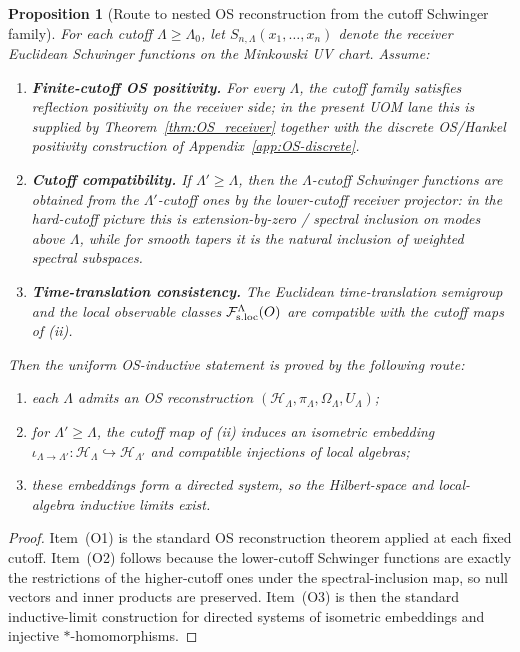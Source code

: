\documentclass[10pt]{article}
\theoremstyle{definition}
\theoremstyle{plain}
\newtheorem{proposition}{Proposition}[section]
\begin{document}
\begin{proposition}[Route to nested OS reconstruction from the cutoff Schwinger family]
\label{prop:uom-OS-inductive-route}
For each cutoff $\Lambda\ge\Lambda_0$, let
\(
S_{n,\Lambda}(x_1,\dots,x_n)
\)
denote the receiver Euclidean Schwinger functions on the Minkowski UV chart.  Assume:
\begin{enumerate}[label=\textnormal{(\roman*)},leftmargin=2.2em,itemsep=1pt]
\item \textbf{Finite-cutoff OS positivity.}
For every $\Lambda$, the cutoff family satisfies reflection positivity on the receiver side; in the present UOM lane this is supplied by
Theorem~\ref{thm:OS_receiver} together with the discrete OS/Hankel positivity construction of Appendix~\ref{app:OS-discrete}.
\item \textbf{Cutoff compatibility.}
If $\Lambda'\ge\Lambda$, then the $\Lambda$-cutoff Schwinger functions are obtained from the $\Lambda'$-cutoff ones by the lower-cutoff
receiver projector: in the hard-cutoff picture this is extension-by-zero / spectral inclusion on modes above $\Lambda$, while for smooth
tapers it is the natural inclusion of weighted spectral subspaces.
\item \textbf{Time-translation consistency.}
The Euclidean time-translation semigroup and the local observable classes $\mathcal F_{\rm s.loc}^\Lambda(O)$ are compatible with the
cutoff maps of \textnormal{(ii)}.
\end{enumerate}
Then the uniform OS-inductive statement is proved by the following route:
\begin{enumerate}[label=\textnormal{(O\arabic*)},leftmargin=2.4em,itemsep=1pt]
\item each $\Lambda$ admits an OS reconstruction
\((\mathcal H_\Lambda,\pi_\Lambda,\Omega_\Lambda,U_\Lambda)\);
\item for $\Lambda'\ge\Lambda$, the cutoff map of \textnormal{(ii)} induces an isometric embedding
\(
\iota_{\Lambda\to\Lambda'}:\mathcal H_\Lambda\hookrightarrow\mathcal H_{\Lambda'}
\)
and compatible injections of local algebras;
\item these embeddings form a directed system, so the Hilbert-space and local-algebra inductive limits exist.
\end{enumerate}
\end{proposition}

\begin{proof}
Item~\textnormal{(O1)} is the standard OS reconstruction theorem applied at each fixed cutoff.  Item~\textnormal{(O2)} follows because the
lower-cutoff Schwinger functions are exactly the restrictions of the higher-cutoff ones under the spectral-inclusion map, so null vectors and
inner products are preserved.  Item~\textnormal{(O3)} is then the standard inductive-limit construction for directed systems of isometric
embeddings and injective $*$-homomorphisms.
\end{proof}
\end{document}

